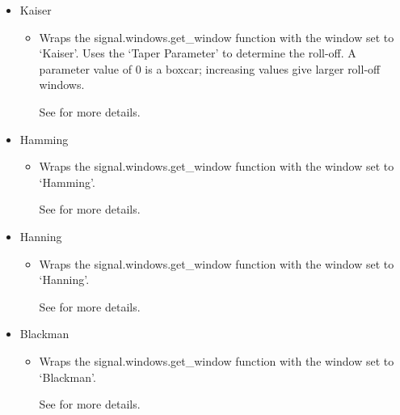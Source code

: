 \documentclass[letterpaper,10pt,english,openany,oneside]{sphinxmanual}
\begin{document}
\label{\detokenize{content/preprocessing/tapering:taper-parameter}}\begin{itemize}
\item {} 
Kaiser
\begin{itemize}
\item {} 
Wraps the signal.windows.get\_window function with the window set to ‘Kaiser’. Uses the ‘Taper Parameter’ to determine the roll-off. A parameter value of 0 is a boxcar; increasing values give larger roll-off windows. %
\begin{footnote}[2]\sphinxAtStartFootnote
See  for more details.
%
\end{footnote}

\end{itemize}

\item {} 
Hamming
\begin{itemize}
\item {} 
Wraps the signal.windows.get\_window function with the window set to ‘Hamming’. %
\begin{footnote}[3]\sphinxAtStartFootnote
See  for more details.
%
\end{footnote}

\end{itemize}

\item {} 
Hanning
\begin{itemize}
\item {} 
Wraps the signal.windows.get\_window function with the window set to ‘Hanning’. %
\begin{footnote}[4]\sphinxAtStartFootnote
See  for more details.
%
\end{footnote}

\end{itemize}

\item {} 
Blackman
\begin{itemize}
\item {} 
Wraps the signal.windows.get\_window function with the window set to ‘Blackman’. %
\begin{footnote}[5]\sphinxAtStartFootnote
See  for more details.
%
\end{footnote}

\end{itemize}

\end{itemize}
\end{document}
